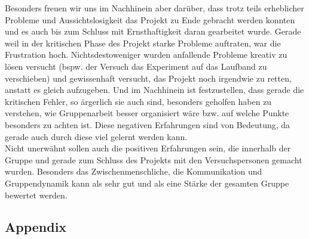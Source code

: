 \documentclass{Bericht}
\begin{document}
Besonders freuen wir uns im Nachhinein aber darüber, dass trotz teils erheblicher Probleme und Aussichtslosigkeit das Projekt zu Ende gebracht werden konnten und es auch bis zum Schluss mit Ernsthaftigkeit daran gearbeitet wurde. Gerade weil in der kritischen Phase des Projekt starke Probleme auftraten, war die Frustration hoch. Nichtsdestoweniger wurden anfallende Probleme kreativ zu lösen versucht (bspw. der Versuch das Experiment auf das Laufband zu verschieben) und gewissenhaft versucht, das Projekt noch irgendwie zu retten, anstatt es gleich aufzugeben. Und im Nachhinein ist festzustellen, dass gerade die kritischen Fehler, so ärgerlich sie auch sind, besonders geholfen haben zu verstehen, wie Gruppenarbeit besser organisiert wäre bzw. auf welche Punkte besonders zu achten ist. Diese negativen Erfahrungen sind von Bedeutung, da gerade auch durch diese viel gelernt werden kann.\\
Nicht unerwähnt sollen auch die positiven Erfahrungen sein, die innerhalb der Gruppe und gerade zum Schluss des Projekts mit den Versuchspersonen gemacht wurden. Besonders das Zwischenmenschliche, die Kommunikation und Gruppendynamik kann als sehr gut und als eine Stärke der gesamten Gruppe bewertet werden.

	


\newpage



\begin{appendix}
\section{Appendix} %

%
	\printbibliography
	\end{appendix}
\vfill %
\end{document}
